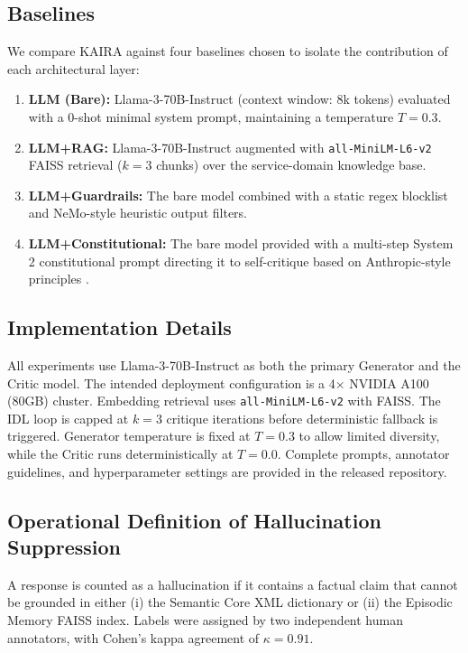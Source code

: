 \documentclass[11pt,a4paper]{article}
\begin{document}
\subsection{Baselines}
We compare KAIRA against four baselines chosen to isolate the contribution of each architectural layer:
\begin{enumerate}
  \item \textbf{LLM (Bare):} Llama-3-70B-Instruct \cite{dubey2024llama3} (context window: 8k tokens) evaluated with a $0$-shot minimal system prompt, maintaining a temperature $T=0.3$.
  \item \textbf{LLM+RAG:} Llama-3-70B-Instruct augmented with \texttt{all-MiniLM-L6-v2} FAISS retrieval ($k=3$ chunks) over the service-domain knowledge base.
  \item \textbf{LLM+Guardrails:} The bare model combined with a static regex blocklist and NeMo-style heuristic output filters.
  \item \textbf{LLM+Constitutional:} The bare model provided with a multi-step System 2 constitutional prompt directing it to self-critique based on Anthropic-style principles \cite{bai2022}.
\end{enumerate}

\subsection{Implementation Details}
All experiments use Llama-3-70B-Instruct as both the primary Generator and the Critic model. The intended deployment configuration is a 4$\times$ NVIDIA A100 (80GB) cluster. Embedding retrieval uses \texttt{all-MiniLM-L6-v2} with FAISS. The IDL loop is capped at $k=3$ critique iterations before deterministic fallback is triggered. Generator temperature is fixed at $T=0.3$ to allow limited diversity, while the Critic runs deterministically at $T=0.0$. Complete prompts, annotator guidelines, and hyperparameter settings are provided in the released repository.

\subsection{Operational Definition of Hallucination Suppression}
A response is counted as a hallucination if it contains a factual claim that cannot be grounded in either (i) the Semantic Core XML dictionary or (ii) the Episodic Memory FAISS index. Labels were assigned by two independent human annotators, with Cohen's kappa agreement of $\kappa = 0.91$.
\end{document}
